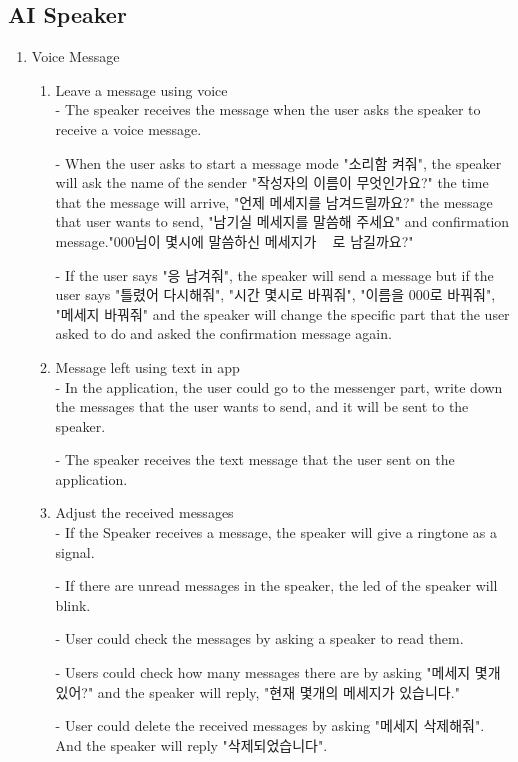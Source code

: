 \documentclass[conference]{IEEEtran}
\begin{document}
\subsection{AI Speaker}
\begin{enumerate}
    \item Voice Message
    \begin{enumerate}
        \item Leave a message using voice\\
        - The speaker receives the message when the user asks the speaker to receive a voice message.
        
        - When the user asks to start a message mode "소리함 켜줘", the speaker will ask the name of the sender "작성자의 이름이 무엇인가요?" the time that the message will arrive, "언제 메세지를 남겨드릴까요?" the message that user wants to send, "남기실 메세지를 말씀해 주세요" and confirmation message."000님이 몇시에 말씀하신 메세지가 ~ 로 남길까요?"
        
        - If the user says "응 남겨줘", the speaker will send a message but if the user says "틀렸어 다시해줘", "시간 몇시로 바꿔줘", "이름을 000로 바꿔줘", "메세지 바꿔줘" and the speaker will change the specific part that the user asked to do and asked the confirmation message again.
        \item Message left using text in app\\
        - In the application, the user could go to the messenger part, write down the messages that the user wants to send, and it will be sent to the speaker.
        
        - The speaker receives the text message that the user sent on the application.
        \item Adjust the received messages\\
        - If the Speaker receives a message, the speaker will give a ringtone as a signal.
        
        - If there are unread messages in the speaker, the led of the speaker will blink.
        
        - User could check the messages by asking a speaker to read them.
        
        - Users could check how many messages there are by asking "메세지 몇개 있어?" and the speaker will reply, "현재 몇개의 메세지가 있습니다."
        
        - User could delete the received messages by asking "메세지 삭제해줘". And the speaker will reply "삭제되었습니다".
    \end{enumerate}
    

\end{enumerate}
\end{document}

